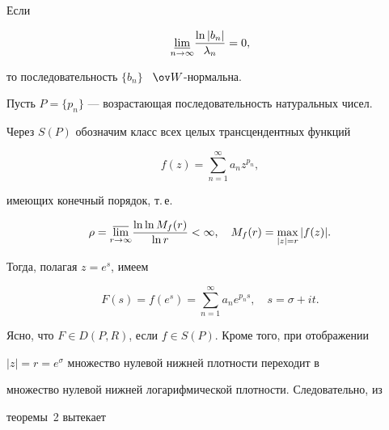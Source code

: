 \begin{note}


Если


$$


\underset{n\to\infty}{\varliminf}{}\frac{\ln|b_n|}{\lambda_n}=0,


$$


то последовательность $\{b_n\}$ \ $\ov W$-нормальна.


\end{note}





Пусть $P=\{p_{n}\}$ --- возрастающая последовательность натуральных чисел.


Через $S(P)$ обозначим класс всех целых трансцендентных функций


\begin{equation}\label{f22}


f(z)=\sum_{n=1}^{\infty}a_{n}z^{p_{n}},


\end{equation}


имеющих конечный порядок, т.\,е.


$$


\rho=\underset{r\to\infty}{\varlimsup}{}


\frac{\ln\ln M_{f}(r)}{\ln r}<\infty,\quad


M_{f}(r)=\max\limits_{|z|=r}|f(z)|.


$$


Тогда, полагая $z=e^{s}$, имеем


$$


F(s)=f(e^{s})=\sum_{n=1}^{\infty}a_{n}e^{p_{n}s},\quad s=\sigma+it.


$$


Ясно, что $F\in D(P,R)$, если $f\in S(P)$. Кроме того, при отображении


$|z|=r=e^{\sigma}$ множество нулевой нижней плотности переходит в


множество нулевой нижней логарифмической плотности. Следовательно, из


теоремы~2 вытекает





